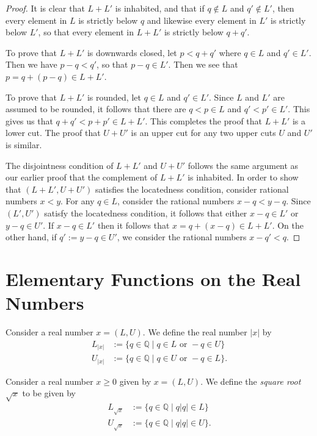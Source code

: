 \begin{proof}
  It is clear that $L+L'$ is inhabited, and that if $q\notin L$ and $q'\notin L'$, then every element in $L$ is strictly below $q$ and likewise every element in $L'$ is strictly below $L'$, so that every element in $L+L'$ is strictly below $q+q'$.

  To prove that $L+L'$ is downwards closed, let $p<q+q'$ where $q\in L$ and $q'\in L'$. Then we have $p-q<q'$, so that $p-q\in L'$. Then we see that $p=q+(p-q)\in L+L'$.

  To prove that $L+L'$ is rounded, let $q\in L$ and $q'\in L'$. Since $L$ and $L'$ are assumed to be rounded, it follows that there are $q<p\in L$ and $q'<p'\in L'$. This gives us that $q+q'<p+p'\in L+L'$. This completes the proof that $L+L'$ is a lower cut. The proof that $U+U'$ is an upper cut for any two upper cuts $U$ and $U'$ is similar.

  The disjointness condition of $L+L'$ and $U+U'$ follows the same argument as our earlier proof that the complement of $L+L'$ is inhabited. In order to show that $(L+L',U+U')$ satisfies the locatedness condition, consider rational numbers $x<y$. For any $q\in L$, consider the rational numbers $x-q<y-q$. Since $(L',U')$ satisfy the locatedness condition, it follows that either $x-q\in L'$ or $y-q\in U'$. If $x-q\in L'$ then it follows that $x=q+(x-q)\in L+L'$. On the other hand, if $q':=y-q\in U'$, we consider the rational numbers $x-q'<q$.
\end{proof}

\section{Elementary Functions on the Real Numbers}

\begin{definition}
  Consider a real number $x=(L,U)$. We define the real number $|x|$ by
  \begin{align*}
    L_{|x|} & := \{q\in \mathbb{Q} \mid q \in L\text{ or }-q\in U\} \\
    U_{|x|} & := \{q\in \mathbb{Q} \mid q \in U\text{ or }-q\in L\}.
  \end{align*}
\end{definition}

\begin{definition}
  Consider a real number $x\geq 0$ given by $x=(L,U)$. We define the \emph{square root} $\sqrt{x}$ to be given by
  \begin{align*}
    L_{\sqrt{x}} & := \{q\in\mathbb{Q} \mid q|q|\in L\} \\
    U_{\sqrt{x}} & := \{q\in\mathbb{Q} \mid q|q|\in U\}.
  \end{align*}
\end{definition}


